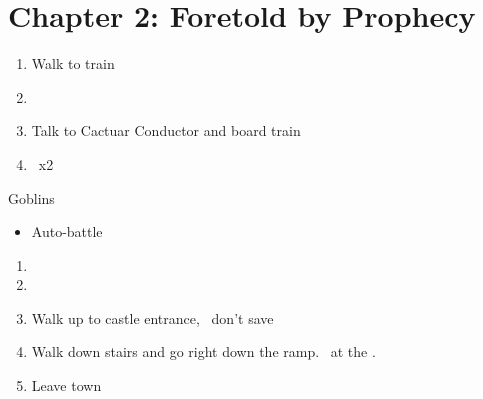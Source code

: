 \chapter{Chapter 2: Foretold by Prophecy}
\begin{enumerate}
	\item Walk to train
	\item \cs\
	\item Talk to Cactuar Conductor and board train
	\item \cs\ x2
\end{enumerate}
\begin{battle}[]{Goblins}
	\begin{itemize}
		\item Auto-battle
	\end{itemize}
\end{battle}
\begin{enumerate}[resume]
	\item \cs%
	\item {}
	\item Walk up to castle entrance, \cs\, don't save
	\item Walk down stairs and go right down the ramp. \cs\ at the \gate.
	\item Leave town
\end{enumerate}